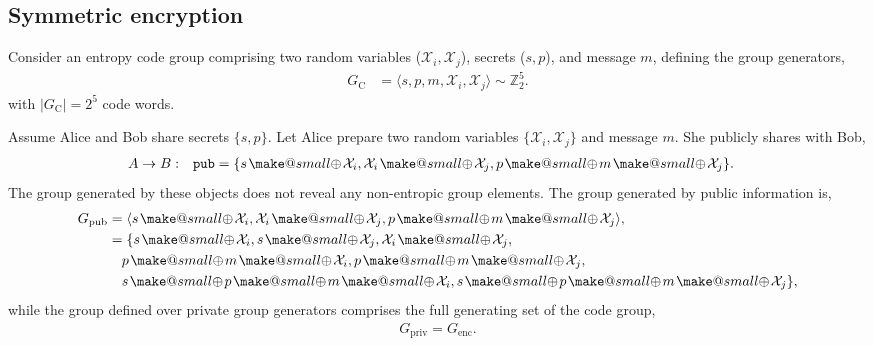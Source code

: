 \documentclass[twocolumn, aps, amsmath, amssymb, nofootinbib, superscriptaddress, longbibliography, doublefloatfix, table-of-contents, eqsecnum, rmp]{revtex4-2}
\makeatletter
\newcommand{\soplus}{{{\hspace{1pt}}{\mathbin{\mathpalette\make@small{\mathbin\oplus}}}}{\hspace{1pt}}}
\newcommand{\make@small}[2]{%
  \vcenter{\hbox{%
    \scalebox{0.6}{$\m@th#1#2$}%
  }}%
}
\makeatother
\begin{document}
\subsection{Symmetric encryption}

Consider an entropy code group comprising two random variables ($\mathcal{X}_i,\mathcal{X}_j$), secrets ($s,p$), and message $m$, defining the group generators,
\begin{align}
	G_\mathrm{C} &= \langle s,p,m,\mathcal{X}_i,\mathcal{X}_j \rangle \sim \mathbb{Z}_2^5.
\end{align}
with $|G_\mathrm{C}|=2^5$ code words.

Assume Alice and Bob share secrets $\{s,p\}$. Let Alice prepare two random variables $\{\mathcal{X}_i,\mathcal{X}_j\}$ and message $m$. She publicly shares with Bob,
\begin{align}
	A\to B:\quad &\mathtt{pub} = \{s\soplus \mathcal{X}_i, \mathcal{X}_i \soplus \mathcal{X}_j, p \soplus m\soplus\mathcal{X}_j\}.
\end{align}
The group generated by these objects does not reveal any non-entropic group elements. The group generated by public information is,
\begin{align}
	G_\mathrm{pub} &= \langle s\soplus \mathcal{X}_i, \mathcal{X}_i \soplus \mathcal{X}_j, p \soplus m\soplus\mathcal{X}_j\rangle,\nonumber\\
	&= \{s\soplus \mathcal{X}_i, s\soplus \mathcal{X}_j, \mathcal{X}_i \soplus \mathcal{X}_j,\nonumber\\
	&\quad p \soplus m\soplus\mathcal{X}_i, p \soplus m\soplus\mathcal{X}_j, \nonumber\\
	&\quad s\soplus p \soplus m\soplus\mathcal{X}_i, s\soplus p \soplus m\soplus\mathcal{X}_j\},
\end{align}
while the group defined over private group generators comprises the full generating set of the code group,
\begin{align}
	G_\mathrm{priv} = G_\mathrm{enc}.
\end{align}
\end{document}
